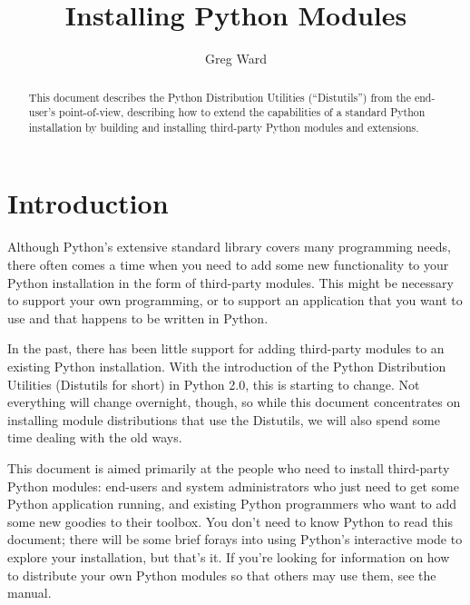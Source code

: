 \documentclass{howto}
\title{Installing Python Modules}
\author{Greg Ward}
\begin{document}
\maketitle

\begin{abstract}
  \noindent
  This document describes the Python Distribution Utilities
  (``Distutils'') from the end-user's point-of-view, describing how to
  extend the capabilities of a standard Python installation by building
  and installing third-party Python modules and extensions.
\end{abstract}


\tableofcontents

\section{Introduction}
\label{intro}

Although Python's extensive standard library covers many programming
needs, there often comes a time when you need to add some new
functionality to your Python installation in the form of third-party
modules.  This might be necessary to support your own programming, or to
support an application that you want to use and that happens to be
written in Python.

In the past, there has been little support for adding third-party
modules to an existing Python installation.  With the introduction of
the Python Distribution Utilities (Distutils for short) in Python 2.0,
this is starting to change.  Not everything will change overnight,
though, so while this document concentrates on installing module
distributions that use the Distutils, we will also spend some time
dealing with the old ways.

This document is aimed primarily at the people who need to install
third-party Python modules: end-users and system administrators who just
need to get some Python application running, and existing Python
programmers who want to add some new goodies to their toolbox.  You
don't need to know Python to read this document; there will be some
brief forays into using Python's interactive mode to explore your
installation, but that's it.  If you're looking for information on how
to distribute your own Python modules so that others may use them, see
the  manual.
\end{document}
